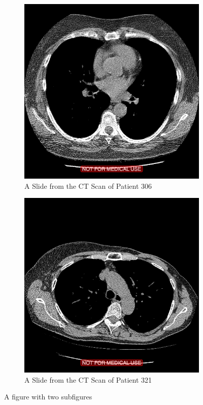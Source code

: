 \documentclass[12pt]{report}
\begin{document}
\begin{figure}
\centering
\begin{subfigure}{.5\textwidth}
  \centering
  \includegraphics[width=0.8\linewidth]{306example}
  \caption{A Slide from the CT Scan of Patient 306}
  \label{fig:sub1}
\end{subfigure}%
\begin{subfigure}{.5\textwidth}
  \centering
  \includegraphics[width=0.8\linewidth]{321example}
  \caption{A Slide from the CT Scan of Patient 321}
  \label{fig:sub2}
\end{subfigure}
\caption{A figure with two subfigures}
\label{fig:test}
\end{figure}
\end{document}
